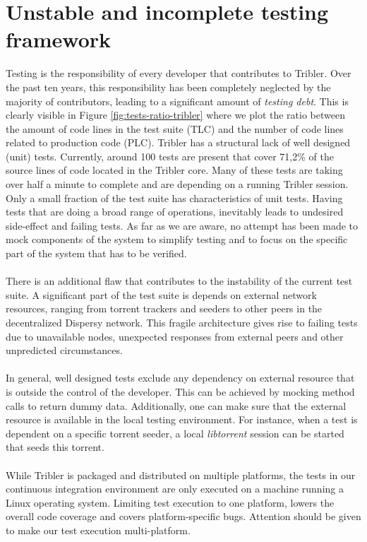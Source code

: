 \section{Unstable and incomplete testing framework}
Testing is the responsibility of every developer that contributes to Tribler. Over the past ten years, this responsibility has been completely neglected by the majority of contributors, leading to a significant amount of \emph{testing debt}. This is clearly visible in Figure \ref{fig:tests-ratio-tribler} where we plot the ratio between the amount of code lines in the test suite (TLC) and the number of code lines related to production code (PLC). Tribler has a structural lack of well designed (unit) tests. Currently, around 100 tests are present that cover 71,2\% of the source lines of code located in the Tribler core. Many of these tests are taking over half a minute to complete and are depending on a running Tribler session. Only a small fraction of the test suite has characteristics of unit tests. Having tests that are doing a broad range of operations, inevitably leads to undesired side-effect and failing tests. As far as we are aware, no attempt has been made to mock components of the system to simplify testing and to focus on the specific part of the system that has to be verified.\\\\
There is an additional flaw that contributes to the instability of the current test suite. A significant part of the test suite is depends on external network resources, ranging from torrent trackers and seeders to other peers in the decentralized Dispersy network. This fragile architecture gives rise to failing tests due to unavailable nodes, unexpected responses from external peers and other unpredicted circumstances.\\\\
In general, well designed tests exclude any dependency on external resource that is outside the control of the developer. This can be achieved by mocking method calls to return dummy data. Additionally, one can make sure that the external resource is available in the local testing environment. For instance, when a test is dependent on a specific torrent seeder, a local \emph{libtorrent} session can be started that seeds this torrent.\\\\
While Tribler is packaged and distributed on multiple platforms, the tests in our continuous integration environment are only executed on a machine running a Linux operating system. Limiting test execution to one platform, lowers the overall code coverage and covers platform-specific bugs\cite{beller2016oops}. Attention should be given to make our test execution multi-platform.

